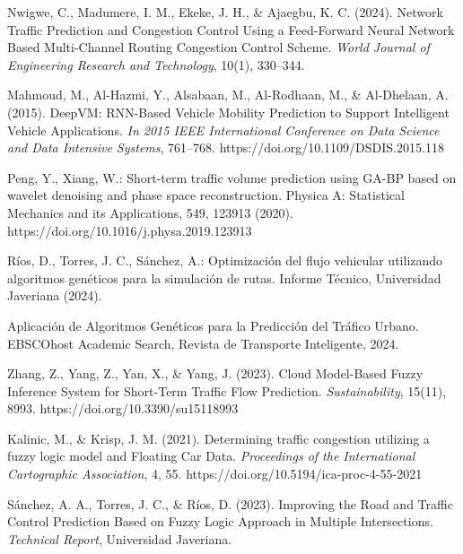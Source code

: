 \documentclass{svproc} %
\begin{document}
\begin{thebibliography}{99}
    Nwigwe, C., Madumere, I. M., Ekeke, J. H., \& Ajaegbu, K. C. (2024). 
    Network Traffic Prediction and Congestion Control Using a Feed-Forward Neural Network Based Multi-Channel Routing Congestion Control Scheme. 
    \textit{World Journal of Engineering Research and Technology}, 10(1), 330–344.

    Mahmoud, M., Al-Hazmi, Y., Alsabaan, M., Al-Rodhaan, M., \& Al-Dhelaan, A. (2015). 
    DeepVM: RNN-Based Vehicle Mobility Prediction to Support Intelligent Vehicle Applications. 
    \textit{In 2015 IEEE International Conference on Data Science and Data Intensive Systems}, 761–768. https://doi.org/10.1109/DSDIS.2015.118

Peng, Y., Xiang, W.: Short-term traffic volume prediction using GA-BP based on wavelet denoising and phase space reconstruction. Physica A: Statistical Mechanics and its Applications, 549, 123913 (2020). https://doi.org/10.1016/j.physa.2019.123913

    Ríos, D., Torres, J. C., Sánchez, A.: Optimización del flujo vehicular utilizando algoritmos genéticos para la simulación de rutas. Informe Técnico, Universidad Javeriana (2024).

    Aplicación de Algoritmos Genéticos para la Predicción del Tráfico Urbano. EBSCOhost Academic Search, Revista de Transporte Inteligente, 2024.

    Zhang, Z., Yang, Z., Yan, X., \& Yang, J. (2023). 
    Cloud Model-Based Fuzzy Inference System for Short-Term Traffic Flow Prediction. 
    \textit{Sustainability}, 15(11), 8993. https://doi.org/10.3390/su15118993

    Kalinic, M., \& Krisp, J. M. (2021). 
    Determining traffic congestion utilizing a fuzzy logic model and Floating Car Data. 
    \textit{Proceedings of the International Cartographic Association}, 4, 55. https://doi.org/10.5194/ica-proc-4-55-2021

    Sánchez, A. A., Torres, J. C., \& Ríos, D. (2023). 
    Improving the Road and Traffic Control Prediction Based on Fuzzy Logic Approach in Multiple Intersections. 
    \textit{Technical Report}, Universidad Javeriana.
  
  \end{thebibliography}
\end{document}
